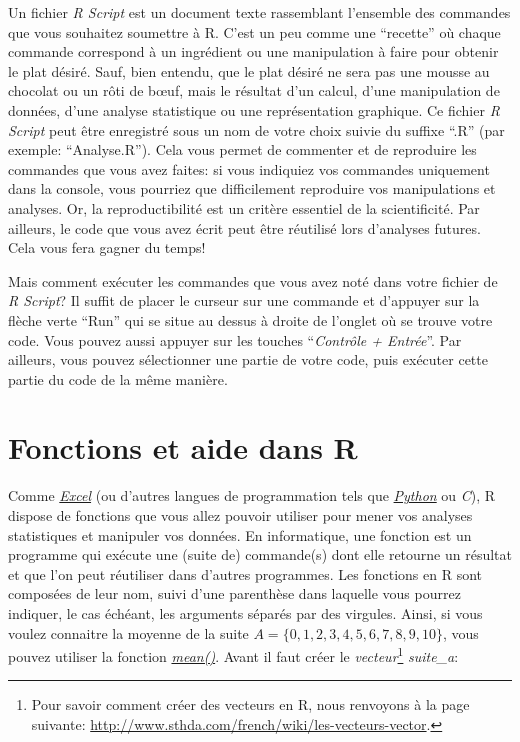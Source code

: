 \documentclass[
]{book}
\begin{document}
Un fichier \emph{R Script} est un document texte rassemblant l'ensemble des commandes que vous souhaitez soumettre à R. C'est un peu comme une ``recette'' où chaque commande correspond à un ingrédient ou une manipulation à faire pour obtenir le plat désiré. Sauf, bien entendu, que le plat désiré ne sera pas une mousse au chocolat ou un rôti de bœuf, mais le résultat d'un calcul, d'une manipulation de données, d'une analyse statistique ou une représentation graphique. Ce fichier \emph{R Script} peut être enregistré sous un nom de votre choix suivie du suffixe ``.R'' (par exemple: ``Analyse.R''). Cela vous permet de commenter et de reproduire les commandes que vous avez faites: si vous indiquiez vos commandes uniquement dans la console, vous pourriez que difficilement reproduire vos manipulations et analyses. Or, la reproductibilité est un critère essentiel de la scientificité. Par ailleurs, le code que vous avez écrit peut être réutilisé lors d'analyses futures. Cela vous fera gagner du temps!

Mais comment exécuter les commandes que vous avez noté dans votre fichier de \emph{R Script}? Il suffit de placer le curseur sur une commande et d'appuyer sur la flèche verte ``Run'' qui se situe au dessus à droite de l'onglet où se trouve votre code. Vous pouvez aussi appuyer sur les touches ``\emph{Contrôle + Entrée}''. Par ailleurs, vous pouvez sélectionner une partie de votre code, puis exécuter cette partie du code de la même manière.

\hypertarget{Fonctions_aides}{%
\section{Fonctions et aide dans R}\label{Fonctions_aides}}

Comme \href{https://www.microsoft.com/fr-be/microsoft-365/excel}{\emph{Excel}} (ou d'autres langues de programmation tels que \href{https://www.python.org/}{\emph{Python}} ou \emph{C}), R dispose de fonctions que vous allez pouvoir utiliser pour mener vos analyses statistiques et manipuler vos données. En informatique, une fonction est un programme qui exécute une (suite de) commande(s) dont elle retourne un résultat et que l'on peut réutiliser dans d'autres programmes. Les fonctions en R sont composées de leur nom, suivi d'une parenthèse dans laquelle vous pourrez indiquer, le cas échéant, les arguments séparés par des virgules. Ainsi, si vous voulez connaitre la moyenne de la suite \(A=\{0,1,2,3,4,5,6,7,8,9,10\}\), vous pouvez utiliser la fonction \href{https://www.rdocumentation.org/packages/base/versions/3.6.2/topics/mean}{\emph{mean()}}. Avant il faut créer le \emph{vecteur}\footnote{Pour savoir comment créer des vecteurs en R, nous renvoyons à la page suivante: \url{http://www.sthda.com/french/wiki/les-vecteurs-vector}.} \emph{suite\_a}:
\end{document}
